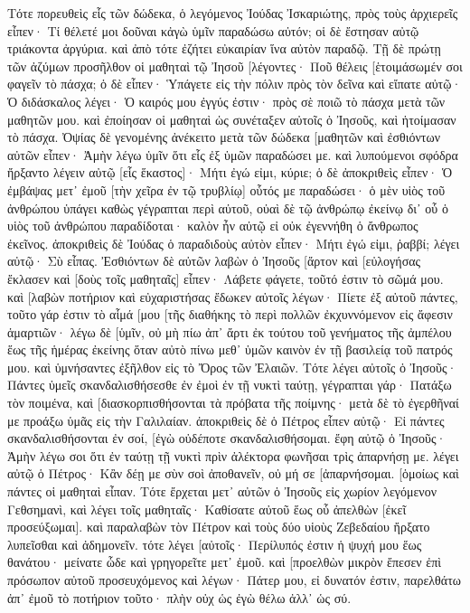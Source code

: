 Τότε πορευθεὶς εἷς τῶν δώδεκα, ὁ λεγόμενος Ἰούδας Ἰσκαριώτης, πρὸς τοὺς ἀρχιερεῖς 
εἶπεν· Τί θέλετέ μοι δοῦναι κἀγὼ ὑμῖν παραδώσω αὐτόν; οἱ δὲ ἔστησαν αὐτῷ τριάκοντα ἀργύρια. 
καὶ ἀπὸ τότε ἐζήτει εὐκαιρίαν ἵνα αὐτὸν παραδῷ. 
Τῇ δὲ πρώτῃ τῶν ἀζύμων προσῆλθον οἱ μαθηταὶ τῷ Ἰησοῦ [λέγοντες· Ποῦ θέλεις [ἑτοιμάσωμέν σοι φαγεῖν τὸ πάσχα; 
ὁ δὲ εἶπεν· Ὑπάγετε εἰς τὴν πόλιν πρὸς τὸν δεῖνα καὶ εἴπατε αὐτῷ· Ὁ διδάσκαλος λέγει· Ὁ καιρός μου ἐγγύς ἐστιν· πρὸς σὲ ποιῶ τὸ πάσχα μετὰ τῶν μαθητῶν μου. 
καὶ ἐποίησαν οἱ μαθηταὶ ὡς συνέταξεν αὐτοῖς ὁ Ἰησοῦς, καὶ ἡτοίμασαν τὸ πάσχα. 
Ὀψίας δὲ γενομένης ἀνέκειτο μετὰ τῶν δώδεκα [μαθητῶν 
καὶ ἐσθιόντων αὐτῶν εἶπεν· Ἀμὴν λέγω ὑμῖν ὅτι εἷς ἐξ ὑμῶν παραδώσει με. 
καὶ λυπούμενοι σφόδρα ἤρξαντο λέγειν αὐτῷ [εἷς ἕκαστος]· Μήτι ἐγώ εἰμι, κύριε; 
ὁ δὲ ἀποκριθεὶς εἶπεν· Ὁ ἐμβάψας μετ᾽ ἐμοῦ [τὴν χεῖρα ἐν τῷ τρυβλίῳ] οὗτός με παραδώσει· 
ὁ μὲν υἱὸς τοῦ ἀνθρώπου ὑπάγει καθὼς γέγραπται περὶ αὐτοῦ, οὐαὶ δὲ τῷ ἀνθρώπῳ ἐκείνῳ δι᾽ οὗ ὁ υἱὸς τοῦ ἀνθρώπου παραδίδοται· καλὸν ἦν αὐτῷ εἰ οὐκ ἐγεννήθη ὁ ἄνθρωπος ἐκεῖνος. 
ἀποκριθεὶς δὲ Ἰούδας ὁ παραδιδοὺς αὐτὸν εἶπεν· Μήτι ἐγώ εἰμι, ῥαββί; λέγει αὐτῷ· Σὺ εἶπας. 
Ἐσθιόντων δὲ αὐτῶν λαβὼν ὁ Ἰησοῦς [ἄρτον καὶ [εὐλογήσας ἔκλασεν καὶ [δοὺς τοῖς μαθηταῖς] εἶπεν· Λάβετε φάγετε, τοῦτό ἐστιν τὸ σῶμά μου. 
καὶ [λαβὼν ποτήριον καὶ εὐχαριστήσας ἔδωκεν αὐτοῖς λέγων· Πίετε ἐξ αὐτοῦ πάντες, 
τοῦτο γάρ ἐστιν τὸ αἷμά [μου [τῆς διαθήκης τὸ περὶ πολλῶν ἐκχυννόμενον εἰς ἄφεσιν ἁμαρτιῶν· 
λέγω δὲ [ὑμῖν, οὐ μὴ πίω ἀπ᾽ ἄρτι ἐκ τούτου τοῦ γενήματος τῆς ἀμπέλου ἕως τῆς ἡμέρας ἐκείνης ὅταν αὐτὸ πίνω μεθ᾽ ὑμῶν καινὸν ἐν τῇ βασιλείᾳ τοῦ πατρός μου. 
καὶ ὑμνήσαντες ἐξῆλθον εἰς τὸ Ὄρος τῶν Ἐλαιῶν. 
Τότε λέγει αὐτοῖς ὁ Ἰησοῦς· Πάντες ὑμεῖς σκανδαλισθήσεσθε ἐν ἐμοὶ ἐν τῇ νυκτὶ ταύτῃ, γέγραπται γάρ· Πατάξω τὸν ποιμένα, καὶ [διασκορπισθήσονται τὰ πρόβατα τῆς ποίμνης· 
μετὰ δὲ τὸ ἐγερθῆναί με προάξω ὑμᾶς εἰς τὴν Γαλιλαίαν. 
ἀποκριθεὶς δὲ ὁ Πέτρος εἶπεν αὐτῷ· Εἰ πάντες σκανδαλισθήσονται ἐν σοί, [ἐγὼ οὐδέποτε σκανδαλισθήσομαι. 
ἔφη αὐτῷ ὁ Ἰησοῦς· Ἀμὴν λέγω σοι ὅτι ἐν ταύτῃ τῇ νυκτὶ πρὶν ἀλέκτορα φωνῆσαι τρὶς ἀπαρνήσῃ με. 
λέγει αὐτῷ ὁ Πέτρος· Κἂν δέῃ με σὺν σοὶ ἀποθανεῖν, οὐ μή σε [ἀπαρνήσομαι. [ὁμοίως καὶ πάντες οἱ μαθηταὶ εἶπαν. 
Τότε ἔρχεται μετ᾽ αὐτῶν ὁ Ἰησοῦς εἰς χωρίον λεγόμενον Γεθσημανὶ, καὶ λέγει τοῖς μαθηταῖς· Καθίσατε αὐτοῦ ἕως οὗ ἀπελθὼν [ἐκεῖ προσεύξωμαι]. 
καὶ παραλαβὼν τὸν Πέτρον καὶ τοὺς δύο υἱοὺς Ζεβεδαίου ἤρξατο λυπεῖσθαι καὶ ἀδημονεῖν. 
τότε λέγει [αὐτοῖς· Περίλυπός ἐστιν ἡ ψυχή μου ἕως θανάτου· μείνατε ὧδε καὶ γρηγορεῖτε μετ᾽ ἐμοῦ. 
καὶ [προελθὼν μικρὸν ἔπεσεν ἐπὶ πρόσωπον αὐτοῦ προσευχόμενος καὶ λέγων· Πάτερ μου, εἰ δυνατόν ἐστιν, παρελθάτω ἀπ᾽ ἐμοῦ τὸ ποτήριον τοῦτο· πλὴν οὐχ ὡς ἐγὼ θέλω ἀλλ᾽ ὡς σύ. 
